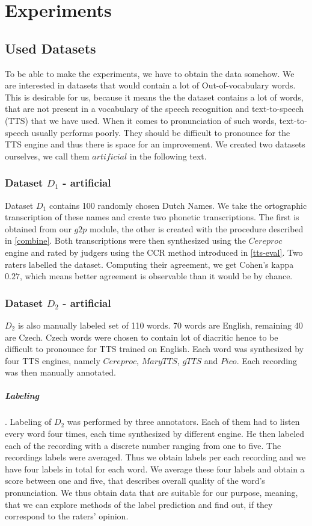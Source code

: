 \chapter{Experiments}
\section{Used Datasets}
\label{data-desc}
To be able to make the experiments, we have to obtain the data somehow.
We are interested in datasets that would contain a lot of Out-of-vocabulary words.
This is desirable for us, because it means the the dataset contains a lot of words, that are not present in a vocabulary of the speech recognition and text-to-speech (TTS) that we have used.
When it comes to pronunciation of such words, text-to-speech usually performs poorly.
They should be difficult to pronounce for the TTS engine and thus there is space for an improvement.
We created two datasets ourselves, we call them $artificial$ in the following text.
\subsection{Dataset \textbf{$D_1$} - artificial}
Dataset $D_1$ contains 100 randomly chosen Dutch Names.
We take the ortographic transcription of these names and create two phonetic transcriptions.
The first is obtained from our $g2p$ module, the other is created with the procedure described in \ref{combine}.
Both transcriptions were then synthesized using the $Cereproc$ engine and rated by judgers using the CCR method introduced in \ref{tts-eval}.
Two raters labelled the dataset.
Computing their agreement, we get Cohen's kappa $0.27$, which means better agreement is observable than it would be by chance.
\subsection{Dataset \textbf{$D_2$} - artificial}
$D_2$ is also manually labeled set of 110 words.
70 words are English, remaining 40 are Czech.
Czech words were chosen to contain lot of diacritic hence to be difficult to pronounce for TTS trained on English.
Each word was synthesized by four TTS engines, namely $Cereproc$, $MaryTTS$, $gTTS$ and $Pico$.
Each recording was then manually annotated.
\paragraph{Labeling}. Labeling of $D_2$  was performed by three annotators. Each of them had to listen every word four times, each time synthesized by different engine. He then labeled each of the recording with a discrete number ranging from one to five. The recordings labels were averaged. Thus we obtain labels per each recording and we have four labels in total for each word. We average these four labels and obtain a score between one and five, that describes overall quality of the word's pronunciation.
We thus obtain data that are suitable for our purpose, meaning, that we can explore methods of the label prediction and find out, if they correspond to the raters' opinion.
